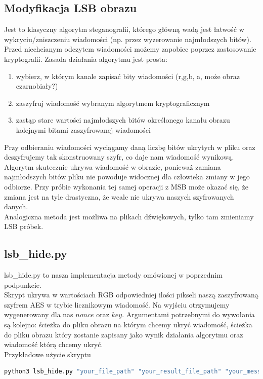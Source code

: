 \documentclass{article}
\begin{document}
\subsection{Modyfikacja LSB obrazu}
Jest to klasyczny algorytm steganografii, którego główną wadą jest łatwość w wykryciu/zniszczeniu wiadomości
(np. przez wyzerowanie najmłodszych bitów). Przed niechcianym odczytem wiadomości możemy zapobiec 
poprzez zastosowanie kryptografii. Zasada działania algorytmu jest prosta:
\begin{enumerate}
	\item wybierz, w którym kanale zapisać bity wiadomości (r,g,b, a, może obraz czarnobiały?)
        \item zaszyfruj wiadomość wybranym algorytmem kryptograficznym
	\item zastąp stare wartości najmłodszych bitów określonego kanału obrazu kolejnymi bitami zaszyfrowanej wiadomości
\end{enumerate}
Przy odbieraniu wiadomości wyciągamy daną liczbę bitów ukrytych w pliku oraz deszyfrujemy tak skonstruowany szyfr, co daje nam wiadomość wynikową.
\\
Algorytm skutecznie ukrywa wiadomość w obrazie, ponieważ zamiana najmłodszych bitów pliku nie powoduje widocznej dla człowieka zmiany w jego odbiorze. Przy próbie wykonania
tej samej operacji z MSB może okazać się, że zmiana jest na tyle drastyczna, że wcale nie ukrywa naszych szyfrowanych danych.
\\
Analogiczna metoda jest możliwa na plikach dźwiękowych, tylko tam zmieniamy LSB próbek.
\subsection*{lsb\_hide.py}
lsb\_hide.py to nasza implementacja metody omówionej w poprzednim podpunkcie. \\

Skrypt ukrywa w wartościach RGB odpowiedniej ilości pikseli naszą zaszyfrowaną szyfrem AES w trybie licznikowym wiadomość.
Na wyjściu otrzymujemy wygenerowany dla nas $nonce$ oraz $key$. Argumentami potrzebnymi do wywołania są kolejno: ścieżka do pliku obrazu na którym chcemy ukryć wiadomość,
 ścieżka do pliku obrazu który zostanie zapisany jako wynik działania algorytmu oraz wiadomość którą chcemy ukryć. \\

Przykładowe użycie skryptu
\begin{lstlisting}[language=bash]
python3 lsb_hide.py "your_file_path" "your_result_file_path" "your_message"
\end{lstlisting}
\end{document}
